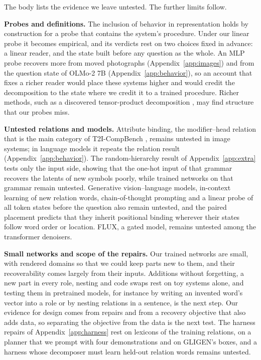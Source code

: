 The body lists the evidence we leave untested. The further limits follow.

\textbf{Probes and definitions.} The inclusion of behavior in representation holds by construction for a probe that contains the system's procedure. Under our linear probe it becomes empirical, and its verdicts rest on two choices fixed in advance: a linear reader, and the state built before any question as the whole. An MLP probe recovers more from moved photographs (Appendix~\ref{app:images}) and from the question state of OLMo-2 7B (Appendix~\ref{app:behavior}), so an account that fixes a richer reader would place these systems higher and would credit the decomposition to the state where we credit it to a trained procedure. Richer methods, such as a discovered tensor-product decomposition \citep{mccoy2019}, may find structure that our probes miss.

\textbf{Untested relations and models.} Attribute binding, the modifier--head relation that is the main category of T2I-CompBench \citep{huang2023t2i,rassin2022}, remains untested in image systems; in language models it repeats the relation result (Appendix~\ref{app:behavior}). The random-hierarchy result of Appendix~\ref{app:extra} tests only the input side, showing that the one-hot input of that grammar recovers the latents of new symbols poorly, while trained networks on that grammar remain untested. Generative vision--language models, in-context learning of new relation words, chain-of-thought prompting and a linear probe of all token states before the question also remain untested, and the paired placement predicts that they inherit positional binding wherever their states follow word order or location. FLUX, a gated model, remains untested among the transformer denoisers.

\textbf{Small networks and scope of the repairs.} Our trained networks are small, with rendered domains so that we could keep parts new to them, and their recoverability comes largely from their inputs. Additions without forgetting, a new part in every role, nesting and code swaps rest on toy systems alone, and testing them in pretrained models, for instance by writing an invented word's vector into a role or by nesting relations in a sentence, is the next step. Our evidence for design comes from repairs and from a recovery objective that also adds data, so separating the objective from the data is the next test. The harness repairs of Appendix~\ref{app:harness} rest on lexicons of the training relations, on a planner that we prompt with four demonstrations and on GLIGEN's boxes, and a harness whose decomposer must learn held-out relation words remains untested.

